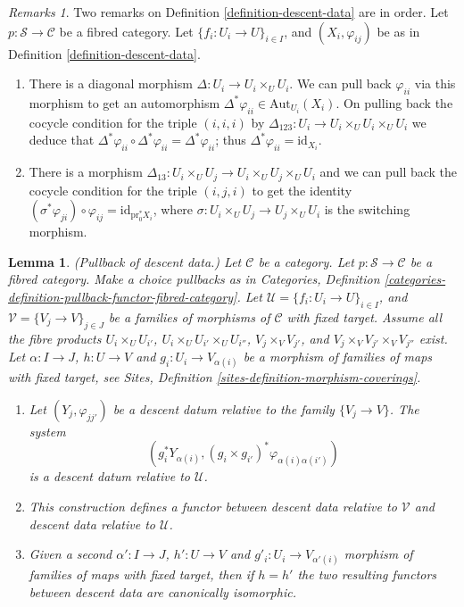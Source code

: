 \documentclass{stacks-project}
\theoremstyle{plain}
\newtheorem{lemma}[subsection]{Lemma}
\theoremstyle{definition}
\theoremstyle{remark}
\newtheorem{remarks}[subsection]{Remarks}
\numberwithin{equation}{subsection}
\begin{document}
\begin{remarks}
\label{remarks-definition-descent-datum}
Two remarks on Definition \ref{definition-descent-data} are in order.
Let $p : \mathcal{S} \to \mathcal{C}$ be a fibred category.
Let $\{f_i : U_i \to U\}_{i \in I}$, and $(X_i, \varphi_{ij})$
be as in Definition \ref{definition-descent-data}.
\begin{enumerate}
\item There is a diagonal morphism $\Delta : U_i \to U_i \times_U U_i$.
We can pull back $\varphi_{ii}$ via this morphism to get an automorphism
$\Delta^\ast \varphi_{ii} \in \text{Aut}_{U_i}(X_i)$.
On pulling back the cocycle condition for the triple $(i, i, i)$
by $\Delta_{123} : U_i \to U_i \times_U U_i \times_U U_i$ we deduce that
$\Delta^\ast \varphi_{ii} \circ \Delta^\ast \varphi_{ii} =
\Delta^\ast \varphi_{ii}$; thus $\Delta^\ast \varphi_{ii} =
\text{id}_{X_i}$.
\item There is a morphism
$\Delta_{13}: U_i \times_U U_j \to U_i \times_U U_j \times_U U_i$
and we can pull back the
cocycle condition for the triple $(i, j, i)$ to get the
identity $(\sigma^\ast \varphi_{ji}) \circ \varphi_{ij} =
\text{id}_{\text{pr}_0^\ast X_i}$, where
$\sigma : U_i \times_U U_j \to U_j \times_U U_i$ is the switching morphism.
\end{enumerate}
\end{remarks}

\begin{lemma}
\label{lemma-pullback}
(Pullback of descent data.)
Let $\mathcal{C}$ be a category.
Let $p : \mathcal{S} \to \mathcal{C}$ be a fibred category.
Make a choice pullbacks as in Categories,
Definition \ref{categories-definition-pullback-functor-fibred-category}.
Let $\mathcal{U} = \{f_i : U_i \to U\}_{i \in I}$, and
$\mathcal{V} = \{V_j \to V\}_{j \in J}$
be a families of morphisms of $\mathcal{C}$ with fixed target.
Assume all the fibre products
$U_i \times_U U_{i'}$, $U_i \times_U U_{i'} \times_U U_{i''}$,
$V_j \times_V V_{j'}$, and $V_j \times_V V_{j'} \times_V V_{j''}$ exist.
Let $\alpha : I \to J$, $h : U \to V$ and
$g_i : U_i \to V_{\alpha(i)}$ be a morphism of families
of maps with fixed target, see
Sites, Definition \ref{sites-definition-morphism-coverings}.
\begin{enumerate}
\item Let $(Y_j, \varphi_{jj'})$ be a descent datum relative to the
family $\{V_j \to V\}$. The system
$$
\left(
g_i^*Y_{\alpha(i)},
(g_i \times g_{i'})^*\varphi_{\alpha(i)\alpha(i')}
\right)
$$
is a descent datum relative to $\mathcal{U}$.
\item This construction defines a functor between descent data relative
to $\mathcal{V}$ and descent data relative to $\mathcal{U}$.
\item Given a second $\alpha' : I \to J$, $h' : U \to V$ and
$g'_i : U_i \to V_{\alpha'(i)}$ morphism of families
of maps with fixed target, then if $h = h'$ the two resulting functors
between descent data are canonically isomorphic.
\end{enumerate}
\end{lemma}
\end{document}
